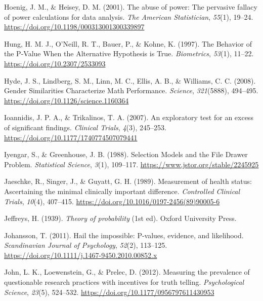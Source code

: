 \documentclass[
  letterpaper,
  DIV=11,
  numbers=noendperiod]{scrreprt}
\newlength{\cslhangindent}
\newlength{\cslentryspacingunit} %
\newenvironment{CSLReferences}[2] %
 {%
  \setlength{\parindent}{0pt}
  \ifodd #1
  \let\oldpar\par
  \def\par{\hangindent=\cslhangindent\oldpar}
  \fi
  \setlength{\parskip}{#2\cslentryspacingunit}
 }%
 {}
\begin{document}
\begin{CSLReferences}{1}{0}
\leavevmode{}%
Hoenig, J. M., \& Heisey, D. M. (2001). The abuse of power: The
pervasive fallacy of power calculations for data analysis. \emph{The
American Statistician}, \emph{55}(1), 19--24.
\url{https://doi.org/10.1198/000313001300339897}

\leavevmode{}%
Hung, H. M. J., O'Neill, R. T., Bauer, P., \& Kohne, K. (1997). The
{Behavior} of the {P-Value When} the {Alternative Hypothesis} is {True}.
\emph{Biometrics}, \emph{53}(1), 11--22.
\url{https://doi.org/10.2307/2533093}

\leavevmode{}%
Hyde, J. S., Lindberg, S. M., Linn, M. C., Ellis, A. B., \& Williams, C.
C. (2008). Gender {Similarities Characterize Math Performance}.
\emph{Science}, \emph{321}(5888), 494--495.
\url{https://doi.org/10.1126/science.1160364}

\leavevmode{}%
Ioannidis, J. P. A., \& Trikalinos, T. A. (2007). An exploratory test
for an excess of significant findings. \emph{Clinical Trials},
\emph{4}(3), 245--253. \url{https://doi.org/10.1177/1740774507079441}

\leavevmode{}%
Iyengar, S., \& Greenhouse, J. B. (1988). Selection {Models} and the
{File Drawer Problem}. \emph{Statistical Science}, \emph{3}(1),
109--117. \url{https://www.jstor.org/stable/2245925}

\leavevmode{}%
Jaeschke, R., Singer, J., \& Guyatt, G. H. (1989). Measurement of health
status: {Ascertaining} the minimal clinically important difference.
\emph{Controlled Clinical Trials}, \emph{10}(4), 407--415.
\url{https://doi.org/10.1016/0197-2456(89)90005-6}

\leavevmode{}%
Jeffreys, H. (1939). \emph{Theory of probability} (1st ed). {Oxford
University Press}.

\leavevmode{}%
Johansson, T. (2011). Hail the impossible: P-values, evidence, and
likelihood. \emph{Scandinavian Journal of Psychology}, \emph{52}(2),
113--125. \url{https://doi.org/10.1111/j.1467-9450.2010.00852.x}

\leavevmode{}%
John, L. K., Loewenstein, G., \& Prelec, D. (2012). Measuring the
prevalence of questionable research practices with incentives for truth
telling. \emph{Psychological Science}, \emph{23}(5), 524--532.
\url{https://doi.org/10.1177/0956797611430953}


\end{CSLReferences}
\end{document}
